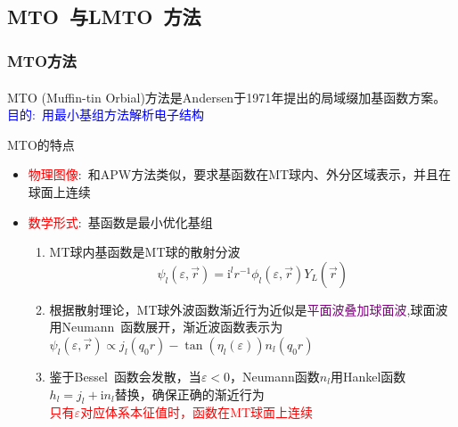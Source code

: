\documentclass[cjk,slidestop,compress,mathserif,blue]{beamer}
\newcommand{\upcite}[1]{\hspace{0ex}\textsuperscript{\cite{#1}}} %
\begin{document}
\subsection{\rm{MTO~}与\rm{LMTO~}方法}
\frame
{
\frametitle{\textrm{MTO}方法}
\textrm{MTO (Muffin-tin Orbial)}方法是\textrm{Andersen}于\textrm{1971}年提出的局域缀加基函数方案\upcite{Andersen_Book}。
\textcolor{blue}{目的:~用最小基组方法解析电子结构}

\textrm{MTO}的特点
\begin{itemize}
	\item \textcolor{red}{物理图像}:~和\textrm{APW}方法类似，要求基函数在\textrm{MT}球内、外分区域表示，并且在球面上连续
	\item \textcolor{red}{数学形式}:~基函数是最小优化基组
		\begin{enumerate}
			\item \textrm{MT}球内基函数是\textrm{MT}球的散射分波 
				$$\psi_l(\varepsilon,\vec r)=\mathrm{i}^lr^{-1}\phi_l(\varepsilon,\vec r)Y_L(\hat{\vec r})$$
			\item 根据散射理论，\textrm{MT}球外波函数渐近行为近似是\textcolor{purple}{平面波叠加球面波},球面波用\textrm{Neumann~}函数展开，渐近波函数表示为$\psi_l(\varepsilon,\vec r)\propto j_l(q_0r)-\tan(\eta_l(\varepsilon))n_l(q_0r)$
			\item 鉴于\textrm{Bessel~}函数会发散，当$\varepsilon<0$，\textrm{Neumann}函数$n_l$用\textrm{Hankel}函数$h_l=j_l+\mathrm{i}n_l$替换，确保正确的渐近行为\\
				\textcolor{red}{只有$\varepsilon$对应体系本征值时，函数在\textrm{MT}球面上连续}
		\end{enumerate}
\end{itemize}

}
\end{document}
